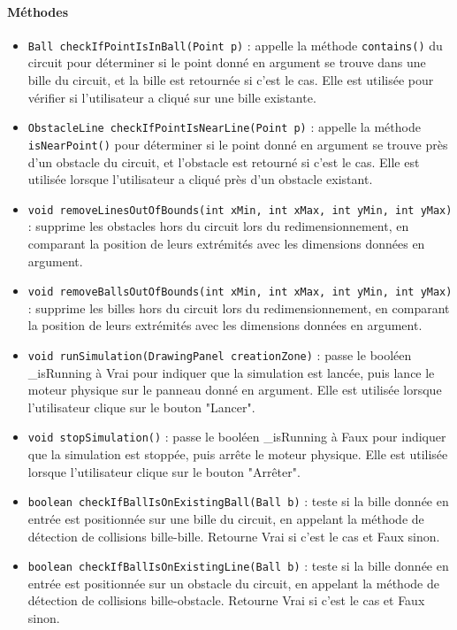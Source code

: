 \documentclass{report}
\begin{document}
\paragraph*{Méthodes}
\begin{itemize}
\item \texttt{Ball checkIfPointIsInBall(Point p)} : appelle la méthode \texttt{contains()} du circuit pour déterminer si le point donné en argument se trouve dans une bille du circuit, et la bille est retournée si c'est le cas. Elle est utilisée pour vérifier si l'utilisateur a cliqué sur une bille existante.
\item \texttt{ObstacleLine checkIfPointIsNearLine(Point p)} : appelle la méthode \texttt{isNearPoint()} pour déterminer si le point donné en argument se trouve près d'un obstacle du circuit, et l'obstacle est retourné si c'est le cas. Elle est utilisée lorsque l'utilisateur a cliqué près d'un obstacle existant.
\item \texttt{void removeLinesOutOfBounds(int xMin, int xMax, int yMin, int yMax)} : supprime les obstacles hors du circuit lors du redimensionnement, en comparant la position de leurs extrémités avec les dimensions données en argument.
\item \texttt{void removeBallsOutOfBounds(int xMin, int xMax, int yMin, int yMax)} : supprime les billes hors du circuit lors du redimensionnement, en comparant la position de leurs extrémités avec les dimensions données en argument.
\item \texttt{void runSimulation(DrawingPanel creationZone)} : passe le booléen \_isRunning à Vrai pour indiquer que la simulation est lancée, puis lance le moteur physique sur le panneau donné en argument. Elle est utilisée lorsque l'utilisateur clique sur le bouton "Lancer".
\item \texttt{void stopSimulation()} : passe le booléen \_isRunning à Faux pour indiquer que la simulation est stoppée, puis arrête le moteur physique. Elle est utilisée lorsque l'utilisateur clique sur le bouton "Arrêter".
\item \texttt{boolean checkIfBallIsOnExistingBall(Ball b)} : teste si la bille donnée en entrée est positionnée sur une bille du circuit, en appelant la méthode de détection de collisions bille-bille. Retourne Vrai si c'est le cas et Faux sinon.
\item \texttt{boolean checkIfBallIsOnExistingLine(Ball b)} : teste si la bille donnée en entrée est positionnée sur un obstacle du circuit, en appelant la méthode de détection de collisions bille-obstacle. Retourne Vrai si c'est le cas et Faux sinon.

\end{itemize}
\end{document}
